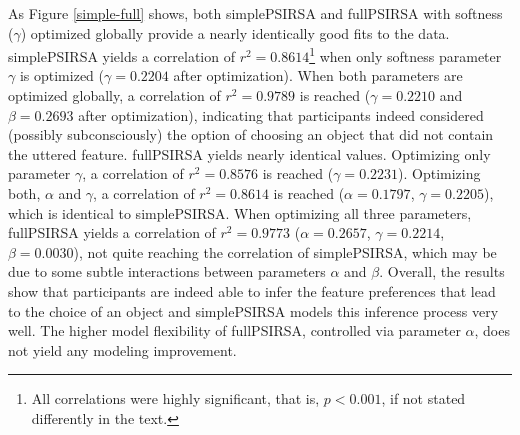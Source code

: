 \documentclass[10pt,a4paper]{article}
\begin{document}
As Figure \ref{simple-full} shows, both simplePSIRSA and fullPSIRSA with softness ($\gamma$) optimized globally provide a nearly identically good fits to the data.
simplePSIRSA yields a correlation of $r^2 = 0.8614$\footnote{All correlations were highly significant, that is, $p < 0.001$, if not stated differently in the text.} when only softness parameter $\gamma$ is optimized ($\gamma=0.2204$ after optimization). 
When both parameters are optimized globally, a correlation of $r^2 = 0.9789$ is reached
($\gamma=0.2210$ and $\beta=0.2693$ after optimization), indicating that participants indeed considered (possibly subconsciously) the option of choosing an object that did not contain the uttered feature. 
fullPSIRSA yields nearly identical values.
Optimizing only parameter $\gamma$, a correlation of $r^2 = 0.8576$ is reached ($\gamma=0.2231$).
Optimizing both, $\alpha$ and $\gamma$, a correlation of $r^2 = 0.8614$ is reached ($\alpha=0.1797$, $\gamma=0.2205$), which is identical to simplePSIRSA.
When optimizing all three parameters, fullPSIRSA yields a correlation of $r^2 = 0.9773$ ($\alpha=0.2657$, $\gamma=0.2214$, $\beta=0.0030$), not quite reaching the correlation of simplePSIRSA, which may be due to some subtle interactions between parameters $\alpha$ and $\beta$. 
Overall, the results show that participants are indeed able to infer the feature preferences that lead to the choice of an object and simplePSIRSA models this inference process very well.
The higher model flexibility of fullPSIRSA, controlled via parameter $\alpha$, does not yield any modeling improvement. 

\end{document}
